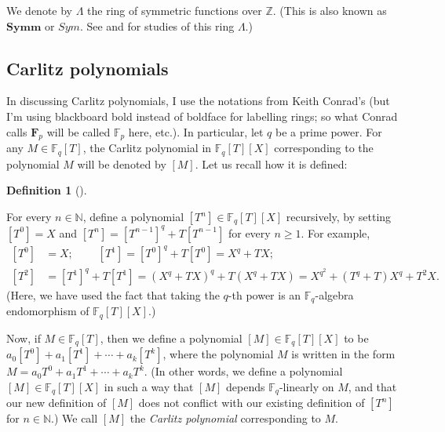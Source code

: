 \documentclass[numbers=enddot,12pt,final,onecolumn,notitlepage]{scrartcl}%
\theoremstyle{definition}
\newtheorem{defi}[theo]{Definition}
\newenvironment{definition}[1][]
{\begin{defi}[#1]\begin{leftbar}}
{\end{leftbar}\end{defi}}
\begin{document}
We denote by $\Lambda$ the ring of symmetric functions over $\mathbb{Z}$.
(This is also known as $\mathbf{Symm}$ or $Sym$. See \cite[\S 2]{reiner-hopf}
and \cite[Chapter 7]{stanley-ec2} for studies of this ring $\Lambda$.)

\subsection{Carlitz polynomials}

In discussing Carlitz polynomials, I use the notations from Keith Conrad's
\cite{kc-carlitz} (but I'm using blackboard bold instead of boldface for
labelling rings; so what Conrad calls $\mathbf{F}_{p}$ will be called
$\mathbb{F}_{p}$ here, etc.). In particular, let $q$ be a prime power. For any
$M\in\mathbb{F}_{q}\left[  T\right]  $, the Carlitz polynomial in
$\mathbb{F}_{q}\left[  T\right]  \left[  X\right]  $ corresponding to the
polynomial $M$ will be denoted by $\left[  M\right]  $. Let us recall how it
is defined:

\begin{definition}
\label{def.carlitzpoly}For every $n\in\mathbb{N}$, define a polynomial
$\left[  T^{n}\right]  \in\mathbb{F}_{q}\left[  T\right]  \left[  X\right]  $
recursively, by setting $\left[  T^{0}\right]  =X$ and $\left[  T^{n}\right]
=\left[  T^{n-1}\right]  ^{q}+T\left[  T^{n-1}\right]  $ for every $n\geq1$.
For example,%
\begin{align*}
\left[  T^{0}\right]   &  =X;\ \ \ \ \ \ \ \ \ \ \left[  T^{1}\right]
=\left[  T^{0}\right]  ^{q}+T\left[  T^{0}\right]  =X^{q}+TX;\\
\left[  T^{2}\right]   &  =\left[  T^{1}\right]  ^{q}+T\left[  T^{1}\right]
=\left(  X^{q}+TX\right)  ^{q}+T\left(  X^{q}+TX\right)  =X^{q^{2}}+\left(
T^{q}+T\right)  X^{q}+T^{2}X.
\end{align*}
(Here, we have used the fact that taking the $q$-th power is an $\mathbb{F}%
_{q}$-algebra endomorphism of $\mathbb{F}_{q}\left[  T\right]  \left[
X\right]  $.)

Now, if $M\in\mathbb{F}_{q}\left[  T\right]  $, then we define a polynomial
$\left[  M\right]  \in\mathbb{F}_{q}\left[  T\right]  \left[  X\right]  $ to
be $a_{0}\left[  T^{0}\right]  +a_{1}\left[  T^{1}\right]  +\cdots
+a_{k}\left[  T^{k}\right]  $, where the polynomial $M$ is written in the form
$M=a_{0}T^{0}+a_{1}T^{1}+\cdots+a_{k}T^{k}$. (In other words, we define a
polynomial $\left[  M\right]  \in\mathbb{F}_{q}\left[  T\right]  \left[
X\right]  $ in such a way that $\left[  M\right]  $ depends $\mathbb{F}_{q}%
$-linearly on $M$, and that our new definition of $\left[  M\right]  $ does
not conflict with our existing definition of $\left[  T^{n}\right]  $ for
$n\in\mathbb{N}$.) We call $\left[  M\right]  $ the \textit{Carlitz
polynomial} corresponding to $M$.
\end{definition}
\end{document}
